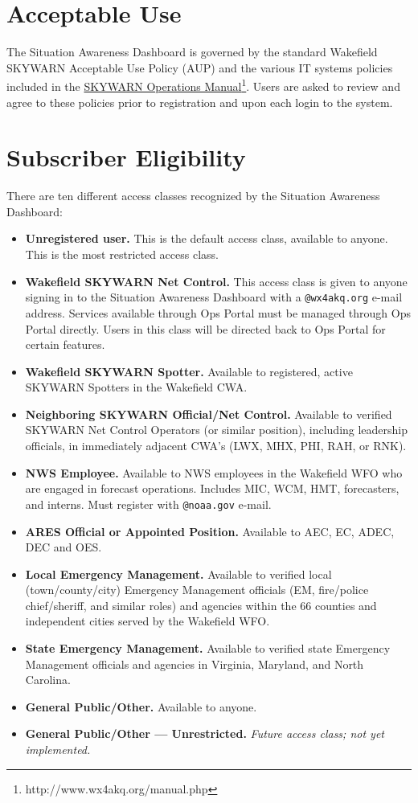 \documentclass[pdflatex,letterpaper,twoside,12pt]{book}
\begin{document}

\section{Acceptable Use}

The Situation Awareness Dashboard is governed by the standard Wakefield SKYWARN Acceptable Use Policy (AUP) and the various IT systems policies included in the \href{http://www.wx4akq.org/manual.php}{SKYWARN Operations Manual\footnote{http://www.wx4akq.org/manual.php}}.  Users are asked to review and agree to these policies prior to registration and upon each login to the system.

\label{sec:eligibility}
\section{Subscriber Eligibility}

There are ten different access classes recognized by the Situation Awareness Dashboard:

\begin{itemize}
\item {\bf Unregistered user.} This is the default access class, available to anyone.  This is the most restricted access class.
\item {\bf Wakefield SKYWARN Net Control.}  This access class is given to anyone signing in to the Situation Awareness Dashboard with a \verb|@wx4akq.org| e-mail address.  Services available through Ops Portal must be managed through Ops Portal directly.  Users in this class will be directed back to Ops Portal for certain features.
\item {\bf Wakefield SKYWARN Spotter.}  Available to registered, active SKYWARN Spotters in the Wakefield CWA.
\item {\bf Neighboring SKYWARN Official/Net Control.}  Available to verified SKYWARN Net Control Operators (or similar position), including leadership officials, in immediately adjacent CWA's (LWX, MHX, PHI, RAH, or RNK).
\item {\bf NWS Employee.}  Available to NWS employees in the Wakefield WFO who are engaged in forecast operations.  Includes MIC, WCM, HMT, forecasters, and interns.  Must register with \verb|@noaa.gov| e-mail.
\item {\bf ARES Official or Appointed Position.}  Available to AEC, EC, ADEC, DEC and OES.
\item {\bf Local Emergency Management.}  Available to verified local (town/county/city) Emergency Management officials (EM, fire/police chief/sheriff, and similar roles) and agencies within the 66 counties and independent cities served by the Wakefield WFO.
\item {\bf State Emergency Management.}  Available to verified state Emergency Management officials and agencies in Virginia, Maryland, and North Carolina.
\item {\bf General Public/Other.}  Available to anyone.
\item {\bf General Public/Other --- Unrestricted.}  \emph{Future access class; not yet implemented.}
\end{itemize}
\end{document}
